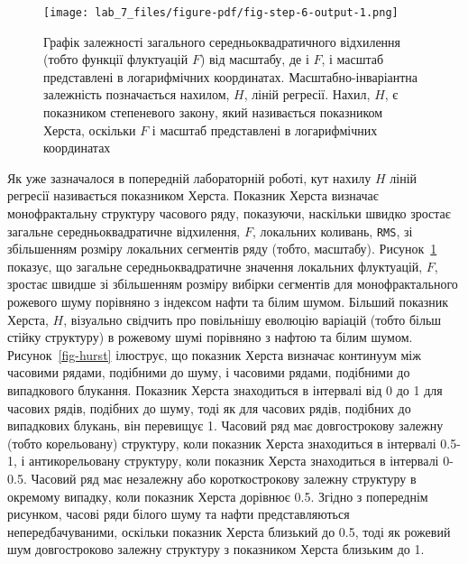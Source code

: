 \documentclass[
  letterpaper,
]{report}
\begin{document}
\begin{figure}[H]

{\centering \texttt{[image: lab\_7\_files/figure-pdf/fig-step-6-output-1.png]}

}

\caption{\label{fig-step-6}Графік залежності загального
середньоквадратичного відхилення (тобто функції флуктуацій \(F\)) від
масштабу, де і \(F\), і масштаб представлені в логарифмічних
координатах. Масштабно-інваріантна залежність позначається нахилом,
\(H\), ліній регресії. Нахил, \(H\), є показником степеневого закону,
який називається показником Херста, оскільки \(F\) і масштаб
представлені в логарифмічних координатах}

\end{figure}

Як уже зазначалося в попередній лабораторній роботі, кут нахилу \(H\)
ліній регресії називається показником Херста. Показник Херста визначає
монофрактальну структуру часового ряду, показуючи, наскільки швидко
зростає загальне середньоквадратичне відхилення, \(F\), локальних
коливань, \texttt{RMS}, зі збільшенням розміру локальних сегментів ряду
(тобто, масштабу). Рисунок~\ref{fig-step-6} показує, що загальне
середньоквадратичне значення локальних флуктуацій, \(F\), зростає швидше
зі збільшенням розміру вибірки сегментів для монофрактального рожевого
шуму порівняно з індексом нафти та білим шумом. Більший показник Херста,
\(H\), візуально свідчить про повільнішу еволюцію варіацій (тобто більш
стійку структуру) в рожевому шумі порівняно з нафтою та білим шумом.
Рисунок~\ref{fig-hurst} ілюструє, що показник Херста визначає континуум
між часовими рядами, подібними до шуму, і часовими рядами, подібними до
випадкового блукання. Показник Херста знаходиться в інтервалі від 0 до 1
для часових рядів, подібних до шуму, тоді як для часових рядів, подібних
до випадкових блукань, він перевищує 1. Часовий ряд має довгострокову
залежну (тобто корельовану) структуру, коли показник Херста знаходиться
в інтервалі 0.5-1, і антикорельовану структуру, коли показник Херста
знаходиться в інтервалі 0-0.5. Часовий ряд має незалежну або
короткострокову залежну структуру в окремому випадку, коли показник
Херста дорівнює 0.5. Згідно з попереднім рисунком, часові ряди білого
шуму та нафти представляються непередбачуваними, оскільки показник
Херста близький до 0.5, тоді як рожевий шум довгостроково залежну
структуру з показником Херста близьким до 1.
\end{document}
